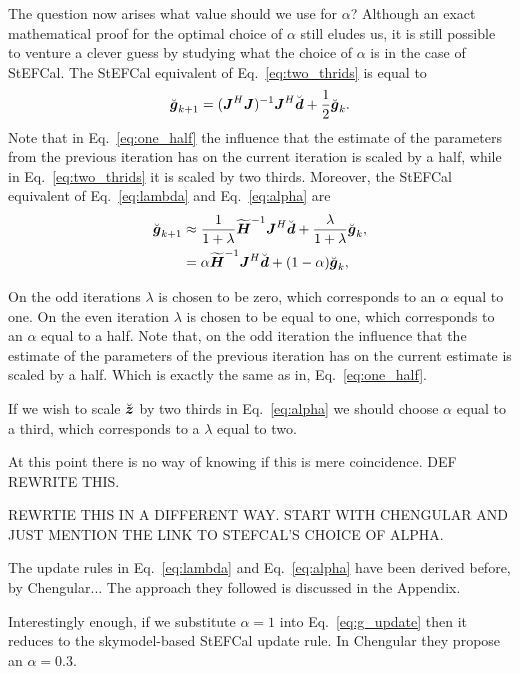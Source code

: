 \documentclass[useAMS,usenatbib]{mn2e}
\newcommand{\bz}{\bmath{z}}
\newcommand{\bg}{\bmath{g}}
\newcommand{\bd}{\bmath{d}}
\newcommand{\bJ}{\bmath{J}}
\newcommand{\bH}{\bmath{H}}
\begin{document}
The question now arises what value should we use for $\alpha$? Although an exact mathematical proof for the optimal choice of $\alpha$ still eludes us, it is still possible to
venture a clever guess by studying what the choice of $\alpha$ is in the case of StEFCal. The StEFCal equivalent of Eq.~\eqref{eq:two_thrids}
is equal to
\begin{equation}
\label{eq:one_half}
\breve{\bg}_{k+1} = (\bJ^H\bJ)^{-1}\bJ^H\breve{\bd} + \frac{1}{2}\breve{\bg}_{k}. 
\end{equation}
Note that in Eq.~\eqref{eq:one_half} the influence that the estimate of the parameters from the previous iteration has on the current iteration is scaled by a half, while
in Eq.~\eqref{eq:two_thrids} it is scaled by two thirds. Moreover, the StEFCal equivalent of Eq.~\eqref{eq:lambda} and Eq.~\eqref{eq:alpha} are
\begin{align}
\breve{\bg}_{k+1} &\approx \frac{1}{1+\lambda}\widetilde{\bH}^{-1}\bJ^H\breve{\bd} + \frac{\lambda}{1+\lambda} \breve{\bg}_k,\label{eq:stef_lambda}\\
 &= \alpha \widetilde{\bH}^{-1}\bJ^H\breve{\bd} + (1-\alpha)\breve{\bg}_k, \label{eq:stef_alpha}  
\end{align}

On the odd iterations $\lambda$ is chosen to be zero, which corresponds to an $\alpha$ equal to one. On the even iteration $\lambda$ is chosen to be equal to one, which corresponds
to an $\alpha$ equal to a half. Note that, on the odd iteration the influence that the estimate of the parameters of the previous iteration has on the current estimate is scaled
by a half. Which is exactly the same as in, Eq.~\eqref{eq:one_half}.  

If we wish to scale $\breve{\bz}$ by two thirds in Eq.~\eqref{eq:alpha} we should choose $\alpha$ equal to a third, which corresponds to a $\lambda$ equal to two.

At this point there is no way of knowing if this is mere coincidence. DEF REWRITE THIS.

REWRTIE THIS IN A DIFFERENT WAY. START WITH CHENGULAR AND JUST MENTION THE LINK TO STEFCAL'S CHOICE OF ALPHA.

The update rules in Eq.~\eqref{eq:lambda} and Eq.~\eqref{eq:alpha} have been derived before, by Chengular... The approach they followed is discussed in the Appendix.

Interestingly enough, if we substitute $\alpha = 1$ into Eq.~\ref{eq:g_update} then it reduces to the skymodel-based StEFCal update rule. In Chengular they propose 
an $\alpha = 0.3$.
\end{document}
